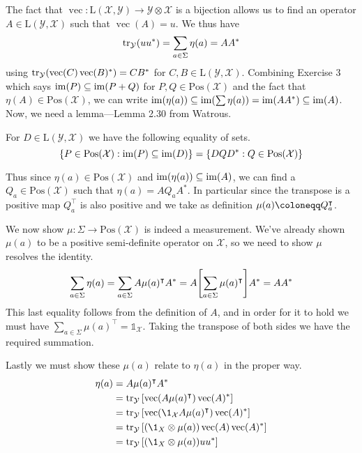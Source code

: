 \documentclass[boxes,pages,color=SeaGreen]{homework}
\renewcommand{\vec}{\operatorname{vec}}
\newcommand{\I}{\mathbb{1}}
\newcommand{\X}{\mathcal{X}}
\newcommand{\Y}{\mathcal{Y}}
\newcommand{\Lin}{\mathrm{L}}
\newcommand{\Pos}{\mathrm{Pos}}
\begin{document}
\begin{solution}
    The fact that $\vec:\Lin(\X,\Y)\to\Y\otimes\X$ is a bijection allows us to find an operator $A\in\Lin(\Y, \X)$ such that $\vec(A) = u$.
    We thus have
    \begin{equation*}
        \tr_\Y(uu^*) = \sum_{a\in\Sigma}\eta(a) = AA^*
    \end{equation*}
    using $\tr_\Y(\vec(C)\vec(B)^*) = CB^*$ for $C, B\in\Lin(\Y, \X)$.
    Combining Exercise 3 which says $\operatorname{im}(P)\subseteq\operatorname{im}(P + Q)$ for $P, Q\in\Pos(\X)$ and the fact that $\eta(A)\in\Pos(\X)$, we can write $\operatorname{im}(\eta(a))\subseteq\operatorname{im}(\sum\eta(a)) = \operatorname{im}(AA^*)\subseteq\operatorname{im}(A)$.
    Now, we need a lemma---Lemma 2.30 from Watrous.
    \begin{lemma}
        For $D\in\Lin(\Y, \X)$ we have the following equality of sets.
        \begin{equation*}
            \qty{P\in\Pos(\X) : \im(P)\subseteq\im(D)} = \qty{DQD^* : Q\in\Pos(\X)}
        \end{equation*}
    \end{lemma}
    Thus since $\eta(a)\in\Pos(\X)$ and $\operatorname{im}(\eta(a)) \subseteq \operatorname{im}(A)$, we can find a $Q_a\in\Pos(\X)$ such that $\eta(a) = AQ_aA^*$.
    In particular since the transpose is a positive map $Q_a^\intercal$ is also positive and we take as definition $\mu(a) \defeq Q_a^\intercal$.

    We now show $\mu: \Sigma \to \Pos(\X)$ is indeed a measurement.
    We've already shown $\mu(a)$ to be a positive semi-definite operator on $\X$, so we need to show $\mu$ resolves the identity.
    \begin{equation*}
        \sum_{a\in\Sigma}\eta(a) = \sum_{a\in\Sigma}A\mu(a)^\intercal A^* = A\qty[\sum_{a\in\Sigma}\mu(a)^\intercal]A^* = AA^*
    \end{equation*}
    This last equality follows from the definition of $A$, and in order for it to hold we must have $\sum_{a\in\Sigma}\mu(a)^\intercal = \I_\X$.
    Taking the transpose of both sides we have the required summation.

    Lastly we must show these $\mu(a)$ relate to $\eta(a)$ in the proper way.
    \begin{align*}
        \eta(a) & = A\mu(a)^\intercal A^*                              \\
                & = \tr_\Y\qty[\vec(A\mu(a)^\intercal)\vec(A)^*]       \\
                & = \tr_\Y\qty[\vec(\1_\X A\mu(a)^\intercal)\vec(A)^*] \\
                & = \tr_\Y\qty[(\1_X\otimes \mu(a))\vec(A)\vec(A)^*]   \\
                & = \tr_\Y\qty[(\1_X\otimes \mu(a))uu^*]
    \end{align*}
\end{solution}
\end{document}
